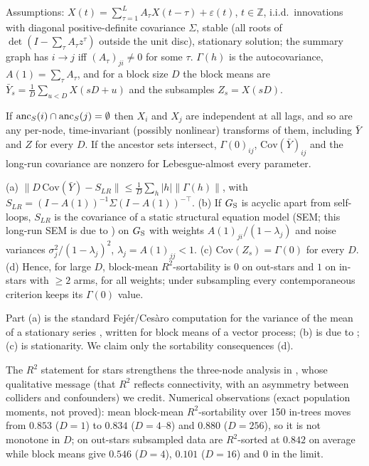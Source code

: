 Assumptions: $X(t)=\sum_{\tau=1}^{L}A_\tau X(t-\tau)+\varepsilon(t)$, $t\in\mathbb Z$,
i.i.d.\ innovations with diagonal positive-definite covariance $\Sigma$, stable
(all roots of $\det(I-\sum_\tau A_\tau z^\tau)$ outside the unit disc),
stationary solution; the summary graph has $i\to j$ iff $(A_\tau)_{ji}\ne0$ for
some $\tau$. $\Gamma(h)$ is the autocovariance, $A(1)=\sum_\tau A_\tau$, and for a
block size $D$ the block means are $\bar Y_s=\frac1D\sum_{u<D}X(sD{+}u)$ and the
subsamples $Z_s=X(sD)$.

\begin{proposition}\label{prop:zero}
If $\mathrm{anc}_S(i)\cap\mathrm{anc}_S(j)=\emptyset$ then $X_i$ and $X_j$ are independent at
all lags, and so are any per-node, time-invariant (possibly nonlinear)
transforms of them, including $\bar Y$ and $Z$ for every $D$. If the
ancestor sets intersect, $\Gamma(0)_{ij}$, $\mathrm{Cov}(\bar Y)_{ij}$ and the
long-run covariance are nonzero for Lebesgue-almost every parameter.
\end{proposition}

\begin{theorem}\label{thm:agg}
(a) $\|D\,\mathrm{Cov}(\bar Y)-S_{LR}\|\le\frac1D\sum_h|h|\|\Gamma(h)\|$,
with $S_{LR}=(I-A(1))^{-1}\Sigma(I-A(1))^{-\top}$.
(b) If $G_{\mathrm S}$ is acyclic apart from self-loops, $S_{LR}$ is the covariance of a
static structural equation model (SEM; this long-run SEM is due to \citealp[Eqs.~(5), (10)]{gong2017aggregated}) on $G_{\mathrm S}$ with weights $A(1)_{ji}/(1-\lambda_j)$ and noise variances
$\sigma_j^2/(1-\lambda_j)^2$, $\lambda_j=A(1)_{jj}<1$.
(c) $\mathrm{Cov}(Z_s)=\Gamma(0)$ for every $D$.
(d) Hence, for large $D$, block-mean $R^2$-sortability is $0$ on out-stars and
$1$ on in-stars with $\ge2$ arms, for all weights; under subsampling every
contemporaneous criterion keeps its $\Gamma(0)$ value.
\end{theorem}
Part (a) is the standard Fej\'er/Ces\`aro computation for the variance of the
mean of a stationary series \citep[Ch.~7]{brockwell1991time}, written for
block means of a vector process; (b) is due to \citet{gong2017aggregated}; (c)
is stationarity. We claim only the sortability consequences (d).

The $R^2$ statement for stars strengthens the three-node analysis in
\citet[App.~D]{herman2025unitless}, whose qualitative message (that $R^2$
reflects connectivity, with an asymmetry between colliders and confounders)
we credit. Numerical observations (exact population moments, not proved):
mean block-mean $R^2$-sortability over 150 in-trees moves from $0.853$
($D=1$) to $0.834$ ($D=4$--$8$) and $0.880$ ($D=256$), so it is not monotone in
$D$; on out-stars subsampled data are $R^2$-sorted at $0.842$ on average while
block means give $0.546$ ($D=4$), $0.101$ ($D=16$) and $0$ in the limit.


